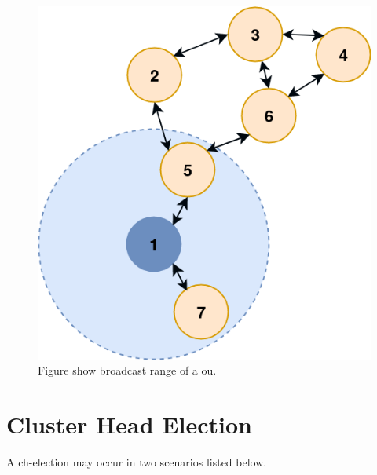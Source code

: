 \documentclass[USenglish]{uit-thesis}
\begin{document}
\begin{figure}
\centering
\includegraphics[scale=0.4]{broadcast_range.png}
\caption{Figure show broadcast range of a \gls{ou}.}
\label{fig:broadcast_range}
\end{figure}



\newpage

\section{Cluster Head Election} \label{des:ch_election}
A \gls{ch}-election may occur in two scenarios listed below.

\end{document}
